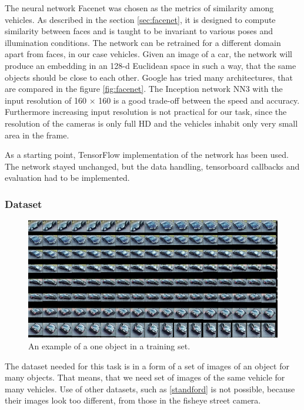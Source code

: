 \documentclass[a4paper,12pt,titlepage, twoside]{article}
\numberwithin{figure}{section}
\begin{document}
The neural network Facenet \cite{schroff2015facenet} was chosen as the metrics of similarity among vehicles. As described in the section \ref{sec:facenet}, it is designed to compute similarity between faces and is taught to be invariant to various poses and illumination conditions. The network can be retrained for a different domain apart from faces, in our case vehicles. Given an image of a car, the network will produce an embedding in an 128-d Euclidean space in such a way, that the same objects should be close to each other. Google has tried many architectures, that are compared in the figure \ref{fig:facenet}. The Inception network NN3 with the input resolution of 160 $\times$ 160 is a good trade-off between the speed and accuracy. Furthermore increasing input resolution is not practical for our task, since the resolution of the cameras is only full HD and the vehicles inhabit only  very small area in the frame.

As a starting point, TensorFlow implementation of the network \cite{facenet} has been used. The network stayed unchanged, but the data handling, tensorboard callbacks and evaluation had to be implemented.

\subsubsection{Dataset}
\begin{figure}[h!]
\centering
\includegraphics[width=1\linewidth]{fig/facenet/labeling.png}
\caption{An example of a one object in a training set.}
\label{fig:facenet-labeling}
\end{figure}

The dataset needed for this task is in a form of a set of images of an object for many objects. That means, that we need set of images of the same vehicle for many vehicles. Use of other datasets, such as \ref{standford} is not possible, because their images look too different, from those in the fisheye street camera.
\end{document}
